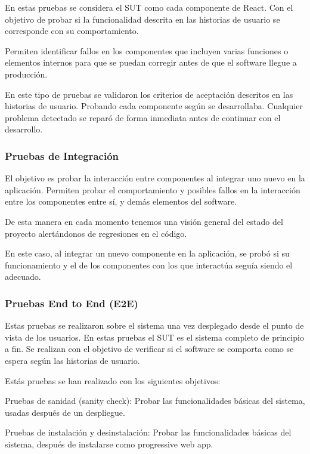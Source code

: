 \documentclass[12pt,twoside,titlepage]{report}
\begin{document}
En estas pruebas se considera el SUT como cada componente de React. Con el objetivo de probar si la funcionalidad descrita en las historias de usuario se corresponde con su comportamiento.

Permiten identificar fallos en los componentes que incluyen varias funciones o elementos internos para que se puedan corregir antes de que el software llegue a producción. 

En este tipo de pruebas se validaron los criterios de aceptación descritos en las historias de usuario. Probando cada componente según se desarrollaba. Cualquier problema detectado se reparó de forma inmediata antes de continuar con el desarrollo.

\subsubsection{Pruebas de Integración}

El objetivo es probar la interacción entre componentes al integrar uno nuevo en la aplicación. Permiten probar el comportamiento y posibles fallos en la interacción entre los componentes entre sí, y demás elementos del software.

De esta manera en cada momento tenemos una visión general del estado del proyecto alertándonos de regresiones en el código.

En este caso, al integrar un nuevo componente en la aplicación, se probó si su funcionamiento y el de los componentes con los que interactúa seguía siendo el adecuado.

\subsubsection{Pruebas End to End (E2E)}

Estas pruebas se realizaron sobre el sistema una vez desplegado desde el punto de vista de los usuarios. En estas pruebas el SUT es el sistema completo de principio a fin. Se realizan con el objetivo de verificar si el software se comporta como se espera según las historias de usuario.

Estás pruebas se han realizado con los siguientes objetivos:

\begin{compactitem}
    \item Pruebas de sanidad (sanity check): Probar las funcionalidades básicas del sistema, usadas después de un despliegue.
    \item Pruebas de instalación y desinstalación: Probar las funcionalidades básicas del sistema, después de instalarse como progressive web app.
\end{compactitem}
\end{document}
